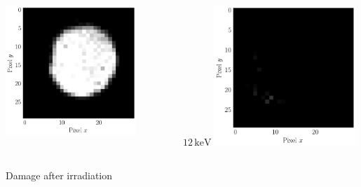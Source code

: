 \begin{frame}
\begin{columns}
\begin{column}{0.45\textwidth}
\begin{columns}
\begin{column}{0.45\textwidth}
          \includegraphics[width=0.8\textwidth]{04_Test/fig/fig000_IRMA_15keV_svg-tex.pdf}
        \end{column}
        \begin{column}{0.45\textwidth}
          \centering
          $12\,\mathrm{keV}$
          \includegraphics[width=0.8\textwidth]{04_Test/fig/fig000_IRMA_12keV_svg-tex.pdf}
        \end{column}
      \end{columns}
      \centering
      Damage after irradiation

\end{column}
\end{columns}
\end{frame}
